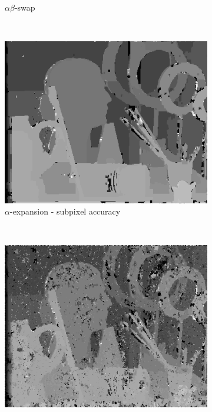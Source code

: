 \documentclass[letterpaper, 10 pt, conference]{ieeeconf}  %
\begin{document}
\begin{figure}[t]
\begin{subfigure}[b]{0.3\textwidth}
                \caption{$\alpha\beta$-swap}
                \label{fig:farm}
        \end{subfigure}
                        ~ %
        \begin{subfigure}[b]{0.3\textwidth}
                \centering
                \includegraphics[width=\textwidth]{imgs/l4disparity-expansion-sub.png}
                \caption{$\alpha$-expansion - subpixel accuracy}
                \label{fig:farm}
        \end{subfigure}
                ~ %
        \begin{subfigure}[b]{0.3\textwidth}
                \centering
                \includegraphics[width=\textwidth]{imgs/l4disparity-swap-sub.png}

\end{subfigure}
\end{figure}
\end{document}
